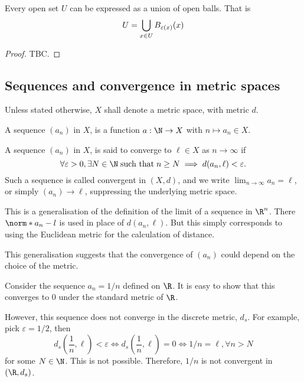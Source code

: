 \begin{nthm}
  Every open set $U$ can be expressed as a union of open balls. That is
  \begin{equation*}
    U = \bigcup_{x \in U} B_{\varepsilon(x)}(x)
  \end{equation*}
\end{nthm}
\begin{proof}
  TBC.
\end{proof}

\subsection{Sequences and convergence in metric spaces}
Unless stated otherwise, $X$ shall denote a metric space, with metric $d$.

\begin{ndfn}[Sequence]
  A sequence $(a_n)$ in $X$, is a function $a:\N \to X$ with $n \mapsto a_n \in X$.
\end{ndfn}

\begin{ndfn}[Convergence]
  A sequence $(a_n)$ in $X$, is said to converge to $\ell \in X$ as $n \to \infty$ if
  \begin{equation*}
    \forall \varepsilon > 0, \exists N \in \N\;\text{such that}\;n \geq N \implies d(a_n, \ell) < \varepsilon.
  \end{equation*}
  Such a sequence is called convergent in $(X,d)$, and we write $\lim_{n\to\infty} a_n = \ell$, or simply $(a_n) \to \ell$, suppressing the underlying metric space.
\end{ndfn}

This is a generalisation of the definition of the limit of a sequence in $\R^n$. There $\norm*{a_n - l}$ is used in place of $d(a_n, \ell)$. But this simply corresponds to using the Euclidean metric for the calculation of distance.

This generalisation suggests that the convergence of $(a_n)$ could depend on the choice of the metric.
\begin{negg}
  Consider the sequence $a_n = 1/n$ defined on $\R$. It is easy to show that this converges to $0$ under the standard metric of $\R$.

  However, this sequence does not converge in the discrete metric, $d_s$. For example, pick $\varepsilon = 1/2$, then
  \begin{equation*}
    d_s\left(\frac{1}{n},\ell\right) < \varepsilon \iff d_s\left(\frac{1}{n},\ell\right) = 0 \iff 1/n = \ell, \forall n>N
  \end{equation*}
  for some $N \in \N$. This is not possible. Therefore, $1/n$ is not convergent in $(\R, d_s)$.
\end{negg}

